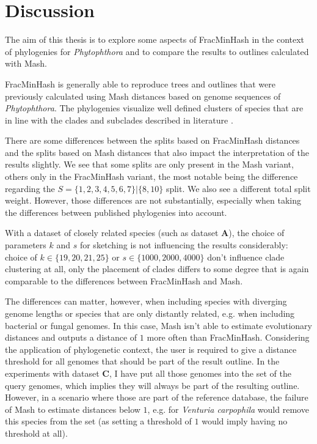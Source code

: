 
\chapter{Discussion}
  \label{sec:diss}

The aim of this thesis is to explore some aspects of FracMinHash in the context
of phylogenies for \textit{Phytophthora} and to compare the results to
outlines calculated with Mash.

FracMinHash is generally able to reproduce trees and outlines that were
previously calculated using Mash distances based on genome sequences of
\textit{Phytophthora}. The phylogenies visualize well defined clusters of
species that are in line with the clades and subclades described in literature
\cite{abadPhytophthoraTaxonomicPhylogenetic2023a,yangExpandedPhylogenyGenus2017}.

There are some differences between the splits based on FracMinHash distances and
the splits based on Mash distances that also impact the interpretation of the
results slightly. We see that some splits are only present in the Mash variant,
others only in the FracMinHash variant, the most notable being the difference
regarding the $S = \{1, 2, 3, 4, 5, 6, 7\}|\{8, 10\}$ split. We also see a
different total split weight. However, those differences are not substantially,
especially when taking the differences between published phylogenies into
account. 

With a dataset of closely related species (such as dataset \textbf{A}), the
choice of
parameters $k$ and $s$ for sketching is not influencing the results
considerably: choice of $k \in \{19, 20, 21, 25\}$ or $s \in \{1000, 2000,
4000\}$ don't influence clade clustering at all, only the placement of clades
differs to some degree that is again comparable to the differences between
FracMinHash and Mash.

The differences can matter, however, when including species with diverging
genome lengths or species that are only distantly related, e.g. when including
bacterial or fungal genomes. In this case, Mash isn't able to estimate
evolutionary distances and outputs a distance of $1$ more often than
FracMinHash. Considering the application of phylogenetic context, the user is
required to give a distance threshold for all genomes that should be part of the
result outline. In the experiments with dataset \textbf{C}, I have put all those
genomes into the set of the query genomes, which implies they will always be
part of the resulting outline. However, in a scenario where those are part of
the reference database, the failure of Mash to estimate distances below $1$,
e.g. for \textit{Venturia carpophila} would remove this species from the set (as
setting a threshold of $1$ would imply having no threshold at all).

